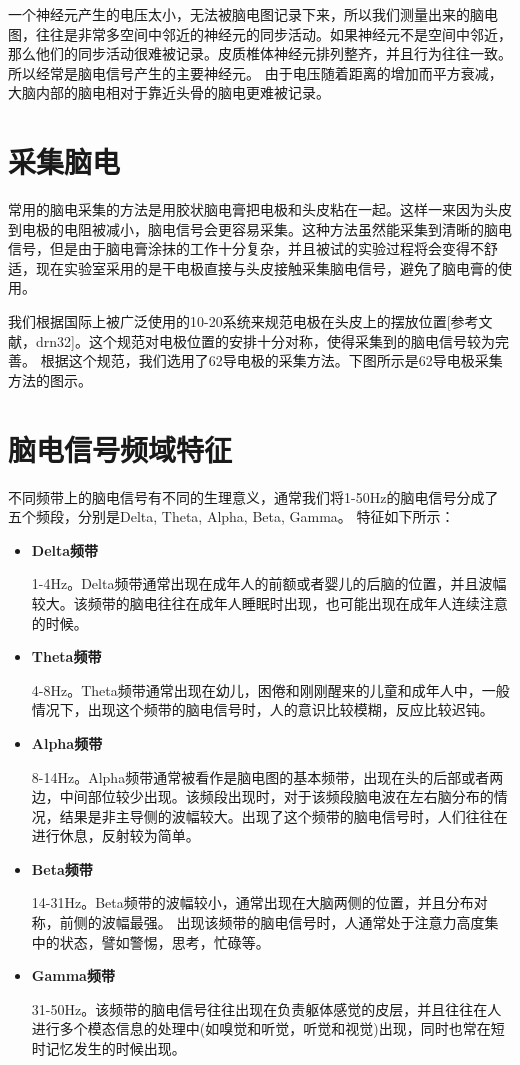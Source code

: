 	一个神经元产生的电压太小，无法被脑电图记录下来，所以我们测量出来的脑电图，往往是非常多空间中邻近的神经元的同步活动。如果神经元不是空间中邻近，那么他们的同步活动很难被记录。皮质椎体神经元排列整齐，并且行为往往一致。所以经常是脑电信号产生的主要神经元。 由于电压随着距离的增加而平方衰减，大脑内部的脑电相对于靠近头骨的脑电更难被记录。
	
\section{采集脑电}

	常用的脑电采集的方法是用胶状脑电膏把电极和头皮粘在一起。这样一来因为头皮到电极的电阻被减小，脑电信号会更容易采集。这种方法虽然能采集到清晰的脑电信号，但是由于脑电膏涂抹的工作十分复杂，并且被试的实验过程将会变得不舒适，现在实验室采用的是干电极直接与头皮接触采集脑电信号，避免了脑电膏的使用。
	
	我们根据国际上被广泛使用的10-20系统来规范电极在头皮上的摆放位置[参考文献，drn32]。这个规范对电极位置的安排十分对称，使得采集到的脑电信号较为完善。 根据这个规范，我们选用了62导电极的采集方法。下图所示是62导电极采集方法的图示。
	
\section{脑电信号频域特征}
	
		不同频带上的脑电信号有不同的生理意义，通常我们将1-50Hz的脑电信号分成了五个频段，分别是Delta, Theta, Alpha, Beta, Gamma。 特征如下所示：
		\begin{itemize}
			\item \textbf{Delta频带}
			
				1-4Hz。Delta频带通常出现在成年人的前额或者婴儿的后脑的位置，并且波幅较大。该频带的脑电往往在成年人睡眠时出现，也可能出现在成年人连续注意的时候。
				
			\item \textbf{Theta频带}
				
				4-8Hz。Theta频带通常出现在幼儿，困倦和刚刚醒来的儿童和成年人中，一般情况下，出现这个频带的脑电信号时，人的意识比较模糊，反应比较迟钝。
				
			\item \textbf{Alpha频带}
			
				8-14Hz。Alpha频带通常被看作是脑电图的基本频带，出现在头的后部或者两边，中间部位较少出现。该频段出现时，对于该频段脑电波在左右脑分布的情况，结果是非主导侧的波幅较大。出现了这个频带的脑电信号时，人们往往在进行休息，反射较为简单。
				
			\item \textbf{Beta频带}
			
				14-31Hz。Beta频带的波幅较小，通常出现在大脑两侧的位置，并且分布对称，前侧的波幅最强。 出现该频带的脑电信号时，人通常处于注意力高度集中的状态，譬如警惕，思考，忙碌等。
				
			\item \textbf{Gamma频带}
			
				31-50Hz。该频带的脑电信号往往出现在负责躯体感觉的皮层，并且往往在人进行多个模态信息的处理中(如嗅觉和听觉，听觉和视觉)出现，同时也常在短时记忆发生的时候出现。
		\end{itemize}
